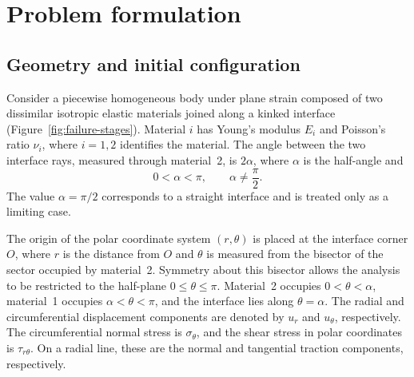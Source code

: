 \section{Problem formulation}
\label{sec:problem}
\providecommand{\AsymptoticsAppendix}{Appendix~\ref{app:asymptotics}}

\subsection{Geometry and initial configuration}
\label{subsec:geometry}

Consider a piecewise homogeneous body under plane strain composed of two
dissimilar isotropic elastic materials joined along a kinked interface
(Figure~\ref{fig:failure-stages}).
Material $i$ has Young's modulus $E_i$ and Poisson's ratio $\nu_i$, where
$i=1,2$ identifies the material. The angle between the two interface rays,
measured through material~2, is $2\alpha$, where $\alpha$ is the half-angle and
\begin{equation*}
  0<\alpha<\pi, \qquad \alpha\ne\frac{\pi}{2}.
\end{equation*}
The value $\alpha=\pi/2$ corresponds to a straight interface and is treated
only as a limiting case.

The origin of the polar coordinate system $(r,\theta)$ is placed at the
interface corner $O$, where $r$ is the distance from $O$ and $\theta$ is
measured from the bisector of the sector occupied by material~2. Symmetry
about this bisector allows the analysis to be restricted to the half-plane
$0\leq\theta\leq\pi$. Material~2 occupies $0<\theta<\alpha$, material~1
occupies $\alpha<\theta<\pi$, and the interface lies along
$\theta=\alpha$. The radial and circumferential displacement components
are denoted by $u_r$ and $u_\theta$, respectively. The circumferential normal
stress is $\sigma_\theta$, and the shear stress in polar coordinates is
$\tau_{r\theta}$. On a radial line, these are the normal and tangential
traction components, respectively.

